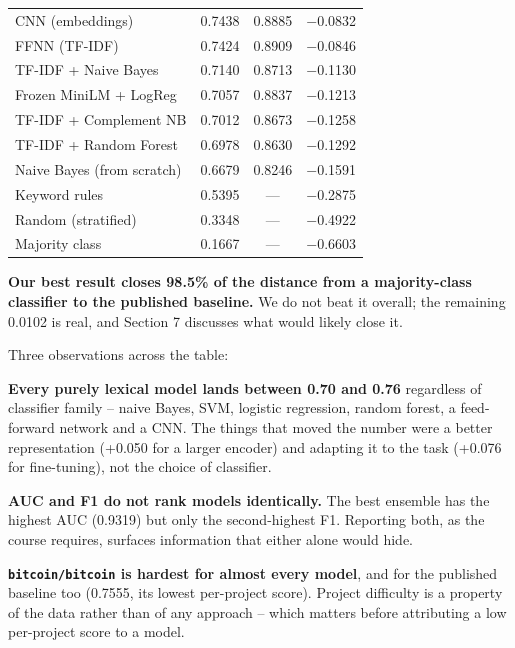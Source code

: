 \begin{table}[H]
\begin{tabular}{l c c c}
CNN (embeddings) & 0.7438 & 0.8885 & $-$0.0832 \\
FFNN (TF-IDF) & 0.7424 & 0.8909 & $-$0.0846 \\
TF-IDF + Naive Bayes & 0.7140 & 0.8713 & $-$0.1130 \\
Frozen MiniLM + LogReg & 0.7057 & 0.8837 & $-$0.1213 \\
TF-IDF + Complement NB & 0.7012 & 0.8673 & $-$0.1258 \\
TF-IDF + Random Forest & 0.6978 & 0.8630 & $-$0.1292 \\
Naive Bayes (from scratch) & 0.6679 & 0.8246 & $-$0.1591 \\
Keyword rules & 0.5395 & --- & $-$0.2875 \\
Random (stratified) & 0.3348 & --- & $-$0.4922 \\
Majority class & 0.1667 & --- & $-$0.6603 \\
\hline
\end{tabular}
\end{table}


\textbf{Our best result closes 98.5\% of the distance from a majority-class classifier to the published baseline.} We do not beat it overall; the remaining 0.0102 is real, and Section 7 discusses what would likely close it.

Three observations across the table:

\textbf{Every purely lexical model lands between 0.70 and 0.76} regardless of classifier family -- naive Bayes, SVM, logistic regression, random forest, a feed-forward network and a CNN. The things that moved the number were a better representation (+0.050 for a larger encoder) and adapting it to the task (+0.076 for fine-tuning), not the choice of classifier.

\textbf{AUC and F1 do not rank models identically.} The best ensemble has the highest AUC (0.9319) but only the second-highest F1. Reporting both, as the course requires, surfaces information that either alone would hide.

\textbf{\texttt{bitcoin/bitcoin} is hardest for almost every model}, and for the published baseline too (0.7555, its lowest per-project score). Project difficulty is a property of the data rather than of any approach -- which matters before attributing a low per-project score to a model.